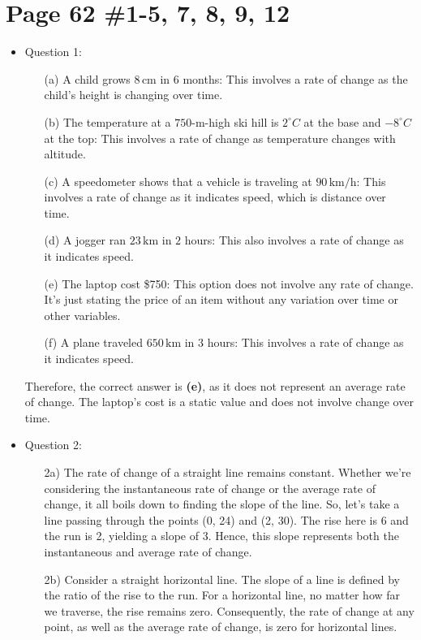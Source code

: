 \documentclass{article}
\begin{document}
\section*{Page 62 \#1-5, 7, 8, 9, 12}
\begin{itemize}
\item Question 1:
\begin{enumerate}
    \item[(a)] A child grows $8 \, \text{cm}$ in $6$ months: This involves a rate of change as the child's height is changing over time.
    \item[(b)] The temperature at a $750$-m-high ski hill is $2^\circ C$ at the base and $-8^\circ C$ at the top: This involves a rate of change as temperature changes with altitude.
    \item[(c)] A speedometer shows that a vehicle is traveling at $90 \, \text{km/h}$: This involves a rate of change as it indicates speed, which is distance over time.
    \item[(d)] A jogger ran $23 \, \text{km}$ in $2$ hours: This also involves a rate of change as it indicates speed.
    \item[(e)] The laptop cost \$750: This option does not involve any rate of change. It's just stating the price of an item without any variation over time or other variables.
    \item[(f)] A plane traveled $650 \, \text{km}$ in $3$ hours: This involves a rate of change as it indicates speed.
\end{enumerate}

Therefore, the correct answer is \textbf{(e)}, as it does not represent an average rate of change. The laptop's cost is a static value and does not involve change over time.

\item Question 2:
\begin{enumerate}
    \item[2a)] The rate of change of a straight line remains constant. Whether we're considering the instantaneous rate of change or the average rate of change, it all boils down to finding the slope of the line. So, let's take a line passing through the points (0, 24) and (2, 30). The rise here is 6 and the run is 2, yielding a slope of 3. Hence, this slope represents both the instantaneous and average rate of change.
    
    \item[2b)] Consider a straight horizontal line. The slope of a line is defined by the ratio of the rise to the run. For a horizontal line, no matter how far we traverse, the rise remains zero. Consequently, the rate of change at any point, as well as the average rate of change, is zero for horizontal lines.
    

\end{enumerate}
\end{itemize}
\end{document}
